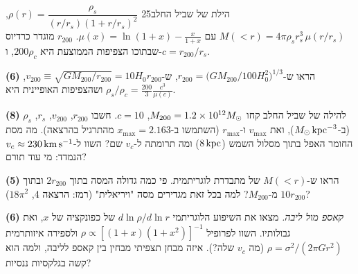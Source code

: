 \documentclass[11pt,a4paper]{article}
\begin{document}
\begin{question}{הילת  של שביל החלב}{25}
$\rho(r)=\dfrac{\rho_s}{(r/r_s)(1+r/r_s)^2}$, $M(<r)=4\pi\rho_sr_s^3\,\mu(r/r_s)$ עם $\mu(x)=\ln(1+x)-\frac{x}{1+x}$. $r_{200}$ מוגדר כרדיוס שבתוכו הצפיפות הממוצעת היא $200\rho_c$, ו-$c=r_{200}/r_s$.
\begin{parts}
\item \textbf{(6)} הראו ש-$r_{200}=\big(GM_{200}/100H_0^2\big)^{1/3}$, ש-$v_{200}\equiv\sqrt{GM_{200}/r_{200}}=10H_0r_{200}$, ושהצפיפות האופיינית היא $\rho_s/\rho_c=\frac{200}{3}\frac{c^3}{\mu(c)}$.
\item \textbf{(8)} להילה של שביל החלב קחו $M_{200}=1.2\times10^{12}M_{\odot}$, $c=10$. חשבו $r_{200}$, $v_{200}$, $r_s$, $\rho_s$ (ב-$M_{\odot}\,\mathrm{kpc}^{-3}$), ואת $v_{\max}$ ו-$r_{\max}$ (השתמשו ב-$x_{\max}=2.163$ מהתרגיל בהרצאה). מה מסת החומר האפל בתוך מסלול השמש ($8\,\mathrm{kpc}$) ומה תרומתה ל-$v_c$ שם? השוו ל-$v_c\approx230\,\mathrm{km\,s^{-1}}$ הנמדד: מי עוד תורם?
\item \textbf{(5)} הראו ש-$M(<r)$ של  מתבדרת לוגריתמית. פי כמה גדולה המסה בתוך $2r_{200}$ ובתוך $10r_{200}$ מ-$M_{200}$? למה בכל זאת מגדירים מסה "ויריאלית" (רמז: הרצאה 4, $18\pi^2$)?
\item \textbf{(6)} \emph{קאספ מול ליבה.} מצאו את השיפוע הלוגריתמי $d\ln\rho/d\ln r$ של  כפונקציה של $x$, ואת גבולותיו. השוו לפרופיל  $\rho\propto[(1+x)(1+x^2)]^{-1}$ ולספירה איזותרמית $\rho=\sigma^2/(2\pi Gr^2)$ (מה $v_c$ שלה?). איזה מבחן תצפיתי מבחין בין קאספ לליבה, ולמה הוא קשה בגלקסיות ננסיות?
\end{parts}
\end{question}
\end{document}
